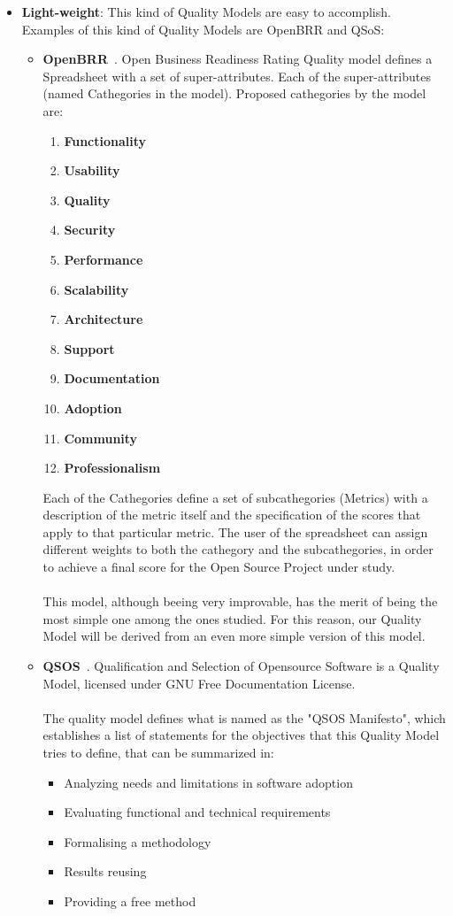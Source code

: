 \documentclass[11pt]{article}
\begin{document}
\begin{itemize}\itemsep0pt
\item{\textbf{Light-weight}}: This kind of Quality Models are easy to accomplish. Examples of this kind of Quality Models are OpenBRR and QSoS:
\begin{itemize}\itemsep0pt
\item{\textbf{OpenBRR}}~\cite{OPENBRR00}.
Open Business Readiness Rating Quality model defines a Spreadsheet with a set of super-attributes. Each of the super-attributes (named Cathegories in the model). Proposed cathegories by the model are:
\begin{enumerate}\itemsep0pt
\item{\textbf{Functionality}}
\item{\textbf{Usability}}
\item{\textbf{Quality}}
\item{\textbf{Security}}
\item{\textbf{Performance}}
\item{\textbf{Scalability}}
\item{\textbf{Architecture}}
\item{\textbf{Support}}
\item{\textbf{Documentation}}
\item{\textbf{Adoption}}
\item{\textbf{Community}}
\item{\textbf{Professionalism}}
\end{enumerate}
Each of the Cathegories define a set of subcathegories (Metrics) with a description of the metric itself and the specification of the scores that apply to that particular metric. The user of the spreadsheet can assign different weights to both the cathegory and the subcathegories, in order to achieve a final score for the Open Source Project under study.\\
\\
This model, although beeing very improvable, has the merit of being the most simple one among the ones studied. For this reason, our Quality Model will be derived from an even more simple version of this model.
\item{\textbf{QSOS}}~\cite{QSOS00}. Qualification and Selection of Opensource Software is a Quality Model, licensed under GNU Free Documentation License.\\
\\
The quality model defines what is named as the "QSOS Manifesto", which establishes a list of statements for the objectives that this Quality Model tries to define, that can be summarized in:
\begin{itemize}\itemsep0pt
\item{Analyzing needs and limitations in software adoption}
\item{Evaluating functional and technical requirements}
\item{Formalising a methodology}
\item{Results reusing}
\item{Providing a free method}
\end{itemize}


\end{itemize}
\end{itemize}
\end{document}
